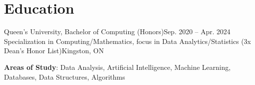 \section{Education}
  \resumeSubHeadingListStart
    \resumeSubheading
      {Queen's University, Bachelor of Computing (Honors)}{Sep. 2020 -- Apr. 2024}
      {Specialization in Computing/Mathematics, focus in Data Analytics/Statistics (3x Dean's Honor List)}{Kingston, ON}
      \begin{itemize}[leftmargin=0.0in, label={}]
    \small{\item{
     \textbf{Areas of Study}{: Data Analysis, Artificial Intelligence, Machine Learning, Databases, Data Structures, Algorithms}
    }}
 \end{itemize}
  \resumeSubHeadingListEnd